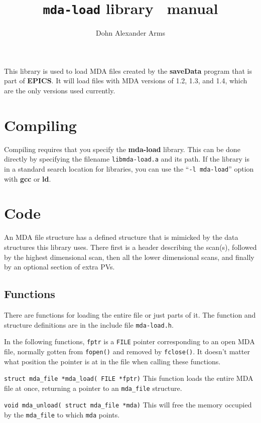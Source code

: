 \documentclass[10pt,letterpaper]{article}
\title{ \vspace{-5ex} \texttt{mda-load} library \version\ manual}
\author{Dohn Alexander Arms}
\begin{document}
\maketitle


This library is used to load MDA files created by the
\textbf{saveData} program that is part of \textbf{EPICS}.
It will load files with MDA versions of 1.2, 1.3, and 1.4,
which are the only versions used currently.


\section{Compiling}

Compiling requires that you specify the \textbf{mda-load} library.
This can be done directly by specifying the filename
\verb+libmda-load.a+ and its path. If the library is in a standard
search location for libraries, you can use the ``\verb+-l mda-load+''
option with \textbf{gcc} or \textbf{ld}.


\section{Code}

An MDA file structure has a defined structure that is mimicked by the
data structures this library uses.  There first is a header describing
the scan(s), followed by the highest dimensional scan, then all the
lower dimensional scans, and finally by an optional section of extra
PVs.


\subsection{Functions}

There are functions for loading the entire file or just parts of it.
The function and structure definitions are in the include file
\verb+mda-load.h+.

In the following functions, \verb+fptr+ is a \verb+FILE+ pointer
corresponding to an open MDA file, normally gotten from \verb+fopen()+
and removed by \verb+fclose()+.  It doesn't matter what position the
pointer is at in the file when calling these functions.

\vspace{1.5ex}
\noindent
\verb+struct mda_file *mda_load( FILE *fptr)+ \linebreak
This function loads the entire MDA file at once, returning a pointer
to an \verb+mda_file+ structure.

\vspace{1.5ex}
\noindent
\verb+void mda_unload( struct mda_file *mda)+ \linebreak 
This will free the memory occupied by the \verb+mda_file+ to which
\verb+mda+ points.
\end{document}
